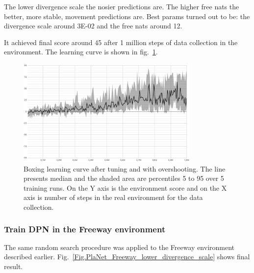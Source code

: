 The lower divergence scale the nosier predictions are. The higher free nats the better, more stable, movement predictions are. Best params turned out to be: the divergence scale around 3E-02 and the free nats around 12.

It achieved final score around 45 after 1 million steps of data collection in the environment. The learning curve is shown in fig.~\ref{Fig.Boxing_with_overshooting}.

\begin{figure}[H]
\includegraphics[width=0.8\textwidth,keepaspectratio]{figures/PlaNet/Boxing_with_overshooting.png}
\caption[Boxing learning curve after tuning and with overshooting]{Boxing learning curve after tuning and with overshooting. The line presents median and the shaded area are percentiles 5 to 95 over 5 training runs. On the Y axis is the environment score and on the X axis is number of steps in the real environment for the data collection.}
\label{Fig.Boxing_with_overshooting}
\end{figure}

\subsubsection{Train DPN in the Freeway environment}

The same random search procedure was applied to the Freeway environment described earlier. Fig.~\ref{Fig.PlaNet_Freeway_lower_divergence_scale} shows final result.

